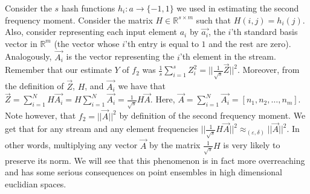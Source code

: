 \documentclass{article}
\newcommand{\eps}{\varepsilon}
\newcommand{\R}{\mathbb R}
\begin{document}
Consider the $s$ hash functions $h_i:a\rightarrow \{-1,1\}$ we used in estimating the second frequency moment.  
Consider the matrix $H \in \R^{s \times m}$ such that $H(i,j) = h_{i}(j)$.
Also, consider representing each input element $a_i$ by $\vec{a_i}$, the $i$'th standard basis vector in $\R^m$ (the vector whose $i$'th entry is equal to $1$ and the rest are zero). Analogously, $\vec{A_i}$ is the vector representing the $i$'th element in the stream. Remember that our estimate $Y$ of $f_2$ was $\frac{1}{s}\sum_{i=1}^{s}Z_{i}^2= ||\frac{1}{\sqrt{s}}\vec{Z}||^2$. Moreover, from the definition of $\vec{Z}$, $H$, and $\vec{A_i}$ we have that $\vec{Z} = \sum_{i=1}^{N}H\vec{A_i} = H\sum_{i=1}^{N}\vec{A_i} = \frac{1}{\sqrt{s}}H\vec{A}$. Here, $\vec{A} = \sum_{i=1}^{N}\vec{A_i} = [n_1,n_2,\ldots,n_m]$. Note however, that $f_2 = ||\vec{A}||^2$ by definition of the second frequency moment.
We get that for any stream and any element frequencies $ ||\frac{1}{\sqrt{s}}H\vec{A}||^2 \approx_{(\eps,\delta)} ||\vec{A}||^2$.
In other words,  multiplying any vector $\vec{A}$ by the matrix $\frac{1}{\sqrt{s}}H$ is very likely to preserve its norm.
We will see that this phenomenon is in fact more overreaching and has some serious consequences on point ensembles in high dimensional euclidian spaces. 
\end{document}
